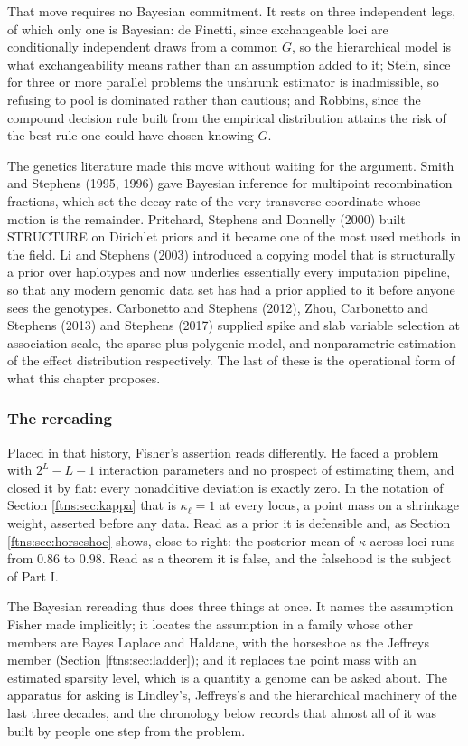That move requires no Bayesian commitment. It rests on three independent legs, of which only one is
Bayesian: de Finetti, since exchangeable loci are conditionally independent draws from a common
$G$, so the hierarchical model is what exchangeability means rather than an assumption added to it;
Stein, since for three or more parallel problems the unshrunk estimator is inadmissible, so
refusing to pool is dominated rather than cautious; and Robbins, since the compound decision rule
built from the empirical distribution attains the risk of the best rule one could have chosen
knowing $G$.

The genetics literature made this move without waiting for the argument. Smith and Stephens (1995,
1996) gave Bayesian inference for multipoint recombination fractions, which set the decay rate of the very transverse
coordinate whose motion is the remainder. Pritchard, Stephens and Donnelly (2000) built STRUCTURE
on Dirichlet priors and it became one of the most used methods in the field. Li and Stephens (2003)
introduced a copying model that is structurally a prior over haplotypes and now underlies
essentially every imputation pipeline, so that any modern genomic data set has had a prior applied
to it before anyone sees the genotypes. Carbonetto and Stephens (2012), Zhou, Carbonetto and
Stephens (2013) and Stephens (2017) supplied spike and slab variable selection at association
scale, the sparse plus polygenic model, and nonparametric estimation of the effect distribution
respectively. The last of these is the operational form of what this chapter proposes.

\subsubsection{The rereading}

Placed in that history, Fisher's assertion reads differently. He faced a problem with $2^L-L-1$
interaction parameters and no prospect of estimating them, and closed it by fiat: every
nonadditive deviation is exactly zero. In the notation of Section \ref{ftns:sec:kappa} that is
$\kappa_\ell=1$ at every locus, a point mass on a shrinkage weight, asserted before any data. Read
as a prior it is defensible and, as Section \ref{ftns:sec:horseshoe} shows, close to right: the
posterior mean of $\kappa$ across loci runs from $0.86$ to $0.98$. Read as a theorem it is false,
and the falsehood is the subject of Part I.

The Bayesian rereading thus does three things at once. It names the assumption Fisher made
implicitly; it locates the assumption in a family whose other members are Bayes Laplace and
Haldane, with the horseshoe as the Jeffreys member (Section \ref{ftns:sec:ladder}); and it replaces the
point mass with an estimated sparsity level, which is a quantity a genome can be asked about. The
apparatus for asking is Lindley's, Jeffreys's and the hierarchical machinery of the last three
decades, and the chronology below records that almost all of it was built by people one step from
the problem.

